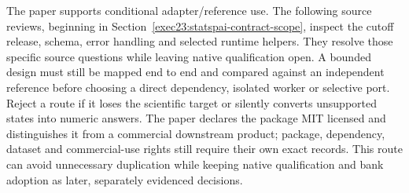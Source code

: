 The paper supports conditional adapter/reference use. The following source reviews, beginning in Section~\ref{exec23:statspai-contract-scope}, inspect the cutoff release, schema, error handling and selected runtime helpers. They resolve those specific source questions while leaving native qualification open. A bounded design must still be mapped end to end and compared against an independent reference before choosing a direct dependency, isolated worker or selective port. Reject a route if it loses the
scientific target or silently converts unsupported states into numeric
answers. The paper declares the package MIT licensed and distinguishes it
from a commercial downstream product; package, dependency, dataset and
commercial-use rights still require their own exact records. This route
can avoid unnecessary duplication while keeping native qualification and
bank adoption as later, separately evidenced decisions.
